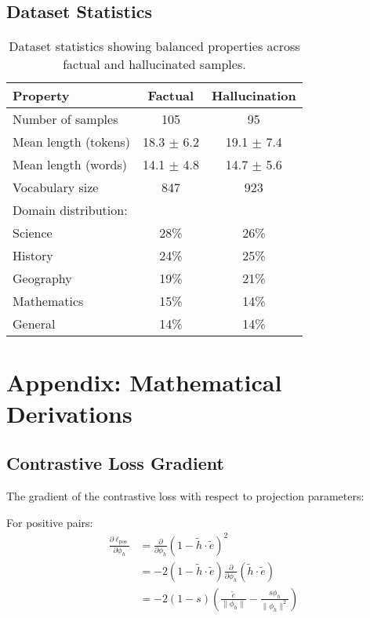 \documentclass[11pt]{article}
\begin{document}
\subsection{Dataset Statistics}

\begin{table}[h]
\centering
\small
\begin{tabular}{lcc}
\toprule
\textbf{Property} & \textbf{Factual} & \textbf{Hallucination} \\
\midrule
Number of samples & 105 & 95 \\
Mean length (tokens) & 18.3 $\pm$ 6.2 & 19.1 $\pm$ 7.4 \\
Mean length (words) & 14.1 $\pm$ 4.8 & 14.7 $\pm$ 5.6 \\
Vocabulary size & 847 & 923 \\
\midrule
Domain distribution: & & \\
\quad Science & 28\% & 26\% \\
\quad History & 24\% & 25\% \\
\quad Geography & 19\% & 21\% \\
\quad Mathematics & 15\% & 14\% \\
\quad General & 14\% & 14\% \\
\bottomrule
\end{tabular}
\caption{Dataset statistics showing balanced properties across factual and hallucinated samples.}
\end{table}

\section{Appendix: Mathematical Derivations}
\label{app:math}

\subsection{Contrastive Loss Gradient}

The gradient of the contrastive loss with respect to projection parameters:

For positive pairs:
\begin{align}
\frac{\partial \ell_{\text{pos}}}{\partial \phi_h} &= \frac{\partial}{\partial \phi_h} (1 - \tilde{h} \cdot \tilde{e})^2 \\
&= -2(1 - \tilde{h} \cdot \tilde{e}) \frac{\partial}{\partial \phi_h}(\tilde{h} \cdot \tilde{e}) \\
&= -2(1 - s) \left( \frac{\tilde{e}}{\|\phi_h\|} - \frac{s \phi_h}{\|\phi_h\|^2} \right)
\end{align}
\end{document}
